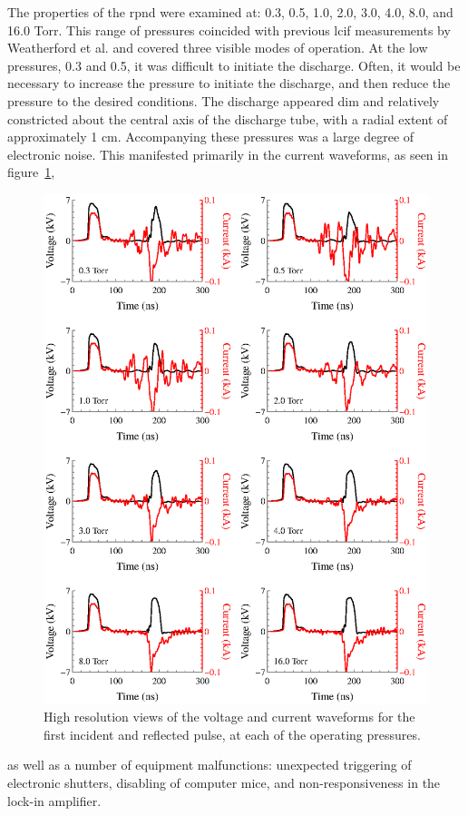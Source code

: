 The properties of the \acs{rpnd} were examined at: 0.3, 0.5, 1.0, 2.0, 3.0, 4.0,
8.0, and 16.0 Torr. This range of pressures coincided with previous \acs{lcif}
measurements by Weatherford et al. \cite{Weatherford2012} and covered three
visible modes of operation. At the low pressures, 0.3 and 0.5, it was difficult
to initiate the discharge. Often, it would be necessary to increase the pressure
to initiate the discharge, and then reduce the pressure to the desired
conditions. The discharge appeared dim and relatively constricted about the
central axis of the discharge tube, with a radial extent of approximately 1 cm.
Accompanying these pressures was a large degree of electronic noise. This
manifested primarily in the current waveforms, as seen in
figure~\ref{fig:waveforms},
\begin{figure}
  \centering
  \includegraphics{./chapters/experiment/figures/waveforms.eps}
  \caption{High resolution views of the voltage and current waveforms for the
  first incident and reflected pulse, at each of the operating pressures.}
  \label{fig:waveforms}
\end{figure}
as well as a number of equipment malfunctions: unexpected triggering of
electronic shutters, disabling of computer mice, and non-responsiveness in the
lock-in amplifier.

